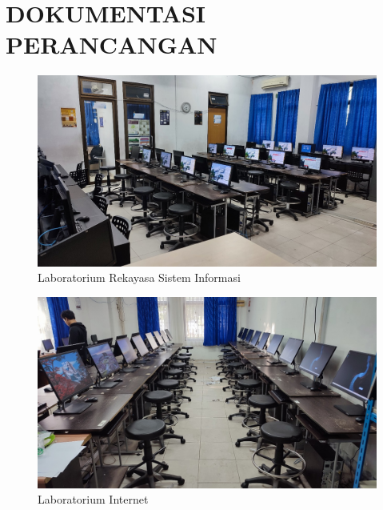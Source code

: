 %
%
%
%


\renewcommand{\thepage}{D - \arabic{page}}
\chapter{DOKUMENTASI PERANCANGAN}


\begin{figure}
	\centering
	\includegraphics[width=0.82\linewidth]{konten/gambar/lab-rsi.jpg}
	\caption{Laboratorium Rekayasa Sistem Informasi}
	\label{fig:lab-rsi-bab2}
\end{figure}

\begin{figure}
	\centering
	\includegraphics[width=0.82\linewidth]{konten/gambar/lab-internet.jpg}
	\caption{Laboratorium Internet}
	\label{fig:lab-int-bab2}
\end{figure}

